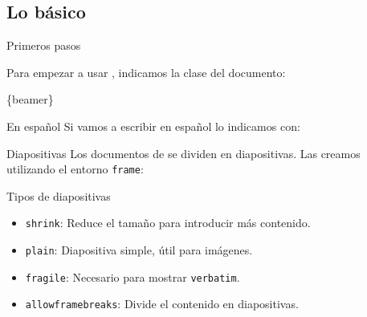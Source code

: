 \subsection{Lo básico}

\begin{frame}{Primeros pasos}

  Para empezar a usar \beamer, indicamos la clase del documento:

    \begin{center}
      \Large {}\color{black}\{beamer\}
    \end{center}

  \pause
  \begin{exampleblock}{En español}
    Si vamos a escribir en español lo indicamos con:
  \end{exampleblock}
\end{frame}

\begin{frame}{Diapositivas}
  Los documentos de \beamer se dividen en diapositivas. Las creamos utilizando
  el entorno \texttt{frame}:


  \pause
  \begin{block}{Tipos de diapositivas}
    \begin{itemize}
      \item \texttt{shrink}:  Reduce el tamaño para introducir más contenido.
      \item \texttt{plain}:   Diapositiva simple, útil para imágenes.
      \item \texttt{fragile}: Necesario para mostrar \texttt{verbatim}.
      \item \texttt{allowframebreaks}: Divide el contenido en diapositivas.
    \end{itemize}
  \end{block}
\end{frame}

\begin{frame}[plain]
\end{frame}
